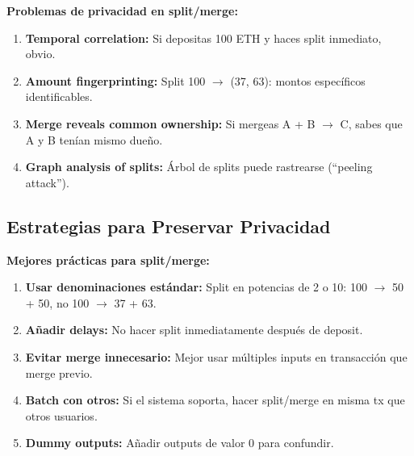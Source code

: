 \documentclass[11pt,a4paper,twoside]{book}
\begin{document}
\begin{remark}
\textbf{Problemas de privacidad en split/merge:}

\begin{enumerate}
    \item \textbf{Temporal correlation:} Si depositas 100 ETH y haces split inmediato, obvio.
    
    \item \textbf{Amount fingerprinting:} Split 100 $\to$ (37, 63): montos espec\'ificos identificables.
    
    \item \textbf{Merge reveals common ownership:} Si mergeas A + B $\to$ C, sabes que A y B ten\'ian mismo due\~no.
    
    \item \textbf{Graph analysis of splits:} \'Arbol de splits puede rastrearse (``peeling attack'').
\end{enumerate}
\end{remark}

\subsection{Estrategias para Preservar Privacidad}

\begin{keyidea}
\textbf{Mejores pr\'acticas para split/merge:}

\begin{enumerate}
    \item \textbf{Usar denominaciones est\'andar:} Split en potencias de 2 o 10: 100 $\to$ 50 + 50, no 100 $\to$ 37 + 63.
    
    \item \textbf{A\~nadir delays:} No hacer split inmediatamente despu\'es de deposit.
    
    \item \textbf{Evitar merge innecesario:} Mejor usar m\'ultiples inputs en transacci\'on que merge previo.
    
    \item \textbf{Batch con otros:} Si el sistema soporta, hacer split/merge en misma tx que otros usuarios.
    
    \item \textbf{Dummy outputs:} A\~nadir outputs de valor 0 para confundir.
\end{enumerate}
\end{keyidea}

\end{document}
